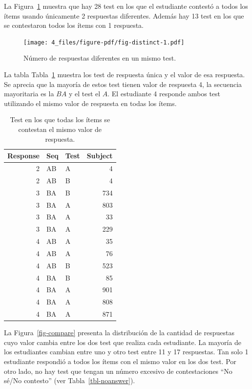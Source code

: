 \documentclass[
  12pt,
  a4paper,
  extrafontsizes,
  onecolumn,
  openright,
  table]{memoir}
\begin{document}
La Figura~\ref{fig-distinct} muestra que hay 28 test en los que el
estudiante contestó a todos los ítems usando únicamente 2 respuestas
diferentes. Además hay 13 test en los que se contestaron todos los ítems
con 1 respuesta.

\begin{figure}[h]

{\centering \texttt{[image: 4\_files/figure-pdf/fig-distinct-1.pdf]}

}

\caption{\label{fig-distinct}Número de respuestas diferentes en un mismo
test.}

\end{figure}

La tabla Tabla~\ref{tbl-distinct2} muestra los test de respuesta única y
el valor de esa respuesta. Se aprecia que la mayoría de estos test
tienen valor de respuesta 4, la secuencia mayoritaria es la \(BA\) y el
test el \(A\). El estudiante 4 responde ambos test utilizando el mismo
valor de respuesta en todas los ítems.

\hypertarget{tbl-distinct2}{}
\begin{longtable}{rllr}
\caption{\label{tbl-distinct2}Test en los que todas los ítems se contestan el mismo valor de
respuesta. }\tabularnewline

\toprule
Response & Seq & Test & Subject \\ 
\midrule
2 & AB & A & 4 \\ 
2 & AB & B & 4 \\ 
3 & BA & B & 734 \\ 
3 & BA & A & 803 \\ 
3 & BA & A & 33 \\ 
3 & BA & A & 229 \\ 
4 & AB & A & 35 \\ 
4 & AB & A & 76 \\ 
4 & AB & B & 523 \\ 
4 & BA & B & 85 \\ 
4 & BA & A & 901 \\ 
4 & BA & A & 808 \\ 
4 & BA & A & 871 \\ 
\bottomrule
\end{longtable}

La Figura~\ref{fig-compare} presenta la distribución de la cantidad de
respuestas cuyo valor cambia entre los dos test que realiza cada
estudiante. La mayoría de los estudiantes cambian entre uno y otro test
entre 11 y 17 respuestas. Tan solo 1 estudiante respondió a todos los
ítems con el mismo valor en los dos test. Por otro lado, no hay test que
tengan un número excesivo de contestaciones \enquote{No sé/No contesto}
(ver Tabla~\ref{tbl-noanswer}).
\end{document}
